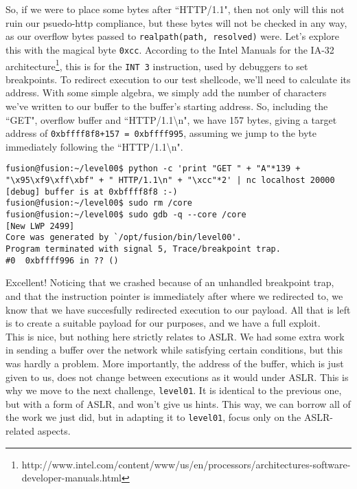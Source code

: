 So, if we were to place some bytes after ``HTTP/1.1", then not only
will this not ruin our psuedo-http compliance, but these bytes will
not be checked in any way, as our overflow bytes passed to \texttt{realpath(path, resolved)} were.
Let's explore this with the magical byte \texttt{0xcc}. According to
the Intel Manuals for the IA-32 architecture\footnote{http://www.intel.com/content/www/us/en/processors/architectures-software-developer-manuals.html}, this
is for the \texttt{INT 3} instruction, used by debuggers to set breakpoints.
To redirect execution to our test shellcode, we'll need to calculate its address.
With some simple algebra, we simply add the number of characters
we've written to our buffer to the buffer's starting address. So, 
including the ``GET", overflow buffer and ``HTTP/1.1\textbackslash n", we have 157
bytes, giving a target address of \texttt{0xbffff8f8+157 = 0xbffff995},
assuming we jump to the byte immediately following the ``HTTP/1.1\textbackslash n".

\begin{lstlisting}
fusion@fusion:~/level00$ python -c 'print "GET " + "A"*139 + "\x95\xf9\xff\xbf" + " HTTP/1.1\n" + "\xcc"*2' | nc localhost 20000
[debug] buffer is at 0xbffff8f8 :-)
fusion@fusion:~/level00$ sudo rm /core
fusion@fusion:~/level00$ sudo gdb -q --core /core
[New LWP 2499]
Core was generated by `/opt/fusion/bin/level00'.
Program terminated with signal 5, Trace/breakpoint trap.
#0  0xbffff996 in ?? ()
\end{lstlisting}

Excellent! Noticing that we crashed because of an unhandled
breakpoint trap, and that the instruction pointer is immediately
after where we redirected to, we know that we have succesfully
redirected execution to our payload. All that is left is to
create a suitable payload for our purposes, and we have
a full exploit.\\

This is nice, but nothing here strictly relates to ASLR. We
had some extra work in sending a buffer over the network while satisfying
certain conditions, but this was hardly a problem. More 
importantly, the address of the buffer, which is just given
to us, does not change between executions as it would under ASLR.
This is why we move to the next challenge, \texttt{level01}. 
It is identical to the previous one, but with a form of ASLR, and 
won't give us hints. This way, we can borrow all of the work
we just did, but in adapting it to \texttt{level01}, focus
only on the ASLR-related aspects.

